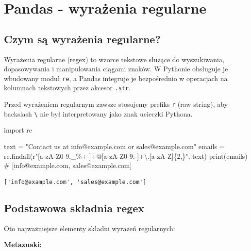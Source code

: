 \documentclass[
  polish,
  letterpaper,
  DIV=11,
  numbers=noendperiod]{scrreprt}
\newenvironment{Shaded}{\begin{snugshade}}{\end{snugshade}}
\newcommand{\BuiltInTok}[1]{\textcolor[rgb]{0.00,0.23,0.31}{#1}}
\newcommand{\CharTok}[1]{\textcolor[rgb]{0.13,0.47,0.30}{#1}}
\newcommand{\CommentTok}[1]{\textcolor[rgb]{0.37,0.37,0.37}{#1}}
\newcommand{\ImportTok}[1]{\textcolor[rgb]{0.00,0.46,0.62}{#1}}
\newcommand{\NormalTok}[1]{\textcolor[rgb]{0.00,0.23,0.31}{#1}}
\newcommand{\OperatorTok}[1]{\textcolor[rgb]{0.37,0.37,0.37}{#1}}
\newcommand{\PreprocessorTok}[1]{\textcolor[rgb]{0.68,0.00,0.00}{#1}}
\newcommand{\StringTok}[1]{\textcolor[rgb]{0.13,0.47,0.30}{#1}}
\newcommand{\VerbatimStringTok}[1]{\textcolor[rgb]{0.13,0.47,0.30}{#1}}
\begin{document}
\chapter{Pandas - wyrażenia
regularne}\label{pandas---wyraux17cenia-regularne}

\section{Czym są wyrażenia
regularne?}\label{czym-sux105-wyraux17cenia-regularne}

Wyrażenia regularne (regex) to wzorce tekstowe służące do wyszukiwania,
dopasowywania i manipulowania ciągami znaków. W Pythonie obsługuje je
wbudowany moduł \texttt{re}, a Pandas integruje je bezpośrednio w
operacjach na kolumnach tekstowych przez akcesor \texttt{.str}.

Przed wyrażeniem regularnym zawsze stosujemy prefiks \texttt{r} (raw
string), aby backslash \texttt{\textbackslash{}} nie był interpretowany
jako znak ucieczki Pythona.

\begin{Shaded}
\begin{Highlighting}[]
\ImportTok{import}\NormalTok{ re}

\NormalTok{text }\OperatorTok{=} \StringTok{"Contact us at info@example.com or sales@example.com"}
\NormalTok{emails }\OperatorTok{=}\NormalTok{ re.findall(}\VerbatimStringTok{r"}\PreprocessorTok{[a{-}zA{-}Z0{-}9.\_\%+{-}]}\OperatorTok{+}\VerbatimStringTok{@}\PreprocessorTok{[a{-}zA{-}Z0{-}9.{-}]}\OperatorTok{+}\CharTok{\textbackslash{}.}\PreprocessorTok{[a{-}zA{-}Z]}\OperatorTok{\{2,\}}\VerbatimStringTok{"}\NormalTok{, text)}
\BuiltInTok{print}\NormalTok{(emails)}
\CommentTok{\# [\textquotesingle{}info@example.com\textquotesingle{}, \textquotesingle{}sales@example.com\textquotesingle{}]}
\end{Highlighting}
\end{Shaded}

\begin{verbatim}
['info@example.com', 'sales@example.com']
\end{verbatim}

\section{Podstawowa składnia regex}\label{podstawowa-skux142adnia-regex}

Oto najważniejsze elementy składni wyrażeń regularnych:

\textbf{Metaznaki:}
\end{document}

